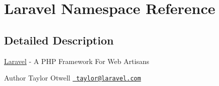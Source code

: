 \hypertarget{namespaceLaravel}{}\section{Laravel Namespace Reference}
\label{namespaceLaravel}


\subsection{Detailed Description}
\mbox{\hyperlink{namespaceLaravel}{Laravel}} -\/ A P\+HP Framework For Web Artisans

\begin{DoxyAuthor}{Author}
Taylor Otwell \href{mailto:taylor@laravel.com}{\texttt{ taylor@laravel.\+com}} 
\end{DoxyAuthor}
